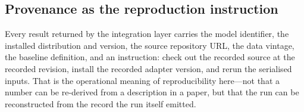 \subsection{Provenance as the reproduction instruction}

Every result returned by the integration layer carries the model identifier, the installed distribution and version, the source repository URL, the data vintage, the baseline definition, and an instruction: check out the recorded source at the recorded revision, install the recorded adapter version, and rerun the serialised inputs. That is the operational meaning of reproducibility here---not that a number can be re-derived from a description in a paper, but that the run can be reconstructed from the record the run itself emitted.
